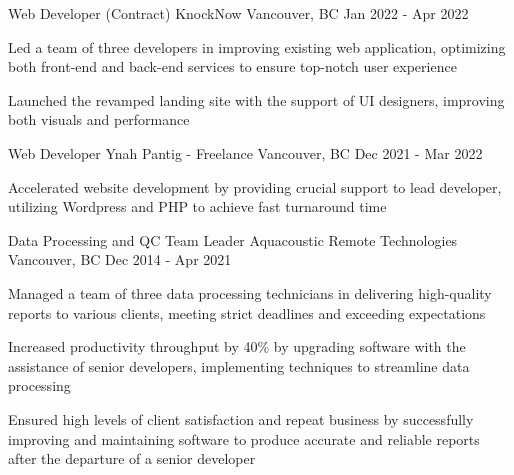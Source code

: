 \begin{cventries}
  \cventry
    {Web Developer (Contract)} %
    {KnockNow} %
    {Vancouver, BC} %
    {Jan 2022 - Apr 2022} %
    {
      \begin{cvitems} %
        \item{Led a team of three developers in improving existing web application, optimizing both front-end and back-end services to ensure top-notch user experience}
        \item{Launched the revamped landing site with the support of UI designers, improving both visuals and performance}
      \end{cvitems}
    }

  \cventry
    {Web Developer} %
    {Ynah Pantig - Freelance} %
    {Vancouver, BC} %
    {Dec 2021 - Mar 2022} %
    {
      \begin{cvitems} %
        \item {Accelerated website development by providing crucial support to lead developer, utilizing Wordpress and PHP to achieve fast turnaround time}
      \end{cvitems}
    }

  \cventry
    {Data Processing and QC Team Leader} %
    {Aquacoustic Remote Technologies} %
    {Vancouver, BC} %
    {Dec 2014 - Apr 2021} %
    {
      \begin{cvitems} %
        \item{Managed a team of three data processing technicians in delivering high-quality reports to various clients, meeting strict deadlines and exceeding expectations}
        \item{Increased productivity throughput by 40\% by upgrading software with the assistance of senior developers, implementing techniques to streamline data processing}
        \item{Ensured high levels of client satisfaction and repeat business by successfully improving and maintaining software to produce accurate and reliable reports after the departure of a senior developer}
      \end{cvitems}
    }

\end{cventries}
